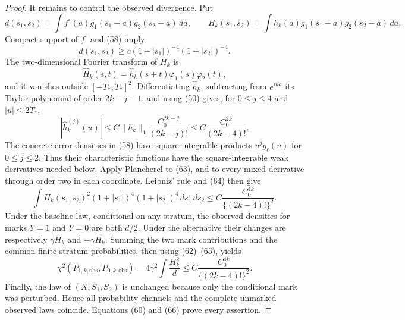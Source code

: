 \documentclass{article}
\begin{document}
\begin{proof}
It remains to control the observed divergence.  Put
\[
d(s_1,s_2)=\int f^\circ(a)g_1(s_1-a)g_2(s_2-a)\,da,
\qquad
H_k(s_1,s_2)=\int h_k(a)g_1(s_1-a)g_2(s_2-a)\,da. \tag{61}
\]
Compact support of \(f^\circ\) and (58) imply
\[
d(s_1,s_2)
\ge c(1+|s_1|)^{-4}(1+|s_2|)^{-4}. \tag{62}
\]
The two-dimensional Fourier transform of \(H_k\) is
\[
\widehat H_k(s,t)=\widehat h_k(s+t)\varphi_1(s)\varphi_2(t), \tag{63}
\]
and it vanishes outside \([-T_*,T_*]^2\).  Differentiating \(\widehat h_k\), subtracting from \(e^{iua}\) its Taylor polynomial of order \(2k-j-1\), and using (50) gives, for \(0\le j\le4\) and \(|u|\le2T_*\),
\[
|\widehat h_k^{(j)}(u)|
\le C\|h_k\|_1\frac{C_0^{2k-j}}{(2k-j)!}
\le C\frac{C_0^{2k}}{(2k-4)!}. \tag{64}
\]
The concrete error densities in (58) have square-integrable products \(u^jg_\ell(u)\) for \(0\le j\le2\).  Thus their characteristic functions have the square-integrable weak derivatives needed below.  Apply Plancherel to (63), and to every mixed derivative through order two in each coordinate.  Leibniz' rule and (64) then give
\[
\int H_k(s_1,s_2)^2(1+|s_1|)^4(1+|s_2|)^4\,ds_1\,ds_2
\le C\frac{C_0^{4k}}{\{(2k-4)!\}^2}. \tag{65}
\]
Under the baseline law, conditional on any stratum, the observed densities for marks \(Y=1\) and \(Y=0\) are both \(d/2\).  Under the alternative their changes are respectively \(\gamma H_k\) and \(-\gamma H_k\).  Summing the two mark contributions and the common finite-stratum probabilities, then using (62)--(65), yields
\[
\chi^2(P_{1,k,\mathrm{obs}},P_{0,k,\mathrm{obs}})
=4\gamma^2\int\frac{H_k^2}{d}
\le C\frac{C_0^{4k}}{\{(2k-4)!\}^2}. \tag{66}
\]
Finally, the law of \((X,S_1,S_2)\) is unchanged because only the conditional mark was perturbed.  Hence all probability channels and the complete unmarked observed laws coincide.  Equations (60) and (66) prove every assertion.
\end{proof}
\end{document}
